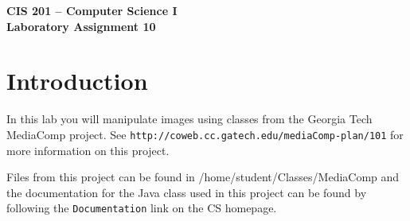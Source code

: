 \documentclass[12pt]{article}
\newenvironment{qv}%
  {\quote
   \verbatim}%
  {\endverbatim
   \endquote}
\begin{document}
\sloppypar

\begin{center}
\Large\bf
CIS 201 -- Computer Science I\\
Laboratory Assignment 10\\
\end{center}

\section*{Introduction}
In this lab you will manipulate images using classes
from the Georgia Tech MediaComp project.
See \verb'http://coweb.cc.gatech.edu/mediaComp-plan/101'
for more information on this project.

Files from this project can be found in
\begin{qv}
/home/student/Classes/MediaComp
\end{qv}
and the documentation for the Java class used in this project can be found
by following the \verb'Documentation' link on the CS homepage.
\end{document}
